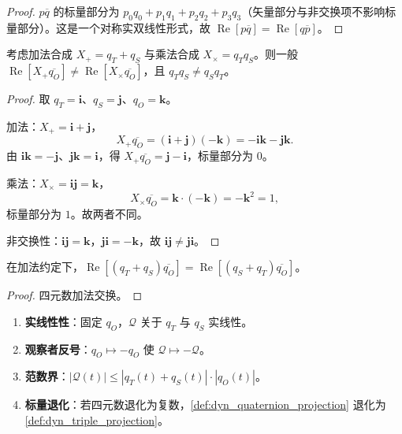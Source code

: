 \begin{proof}
$p\overline q$ 的标量部分为 $p_0q_0+p_1q_1+p_2q_2+p_3q_3$（矢量部分与非交换项不影响标量部分）。这是一个对称实双线性形式，故 $\operatorname{Re}[p\overline q]=\operatorname{Re}[q\overline p]$。
\end{proof}

\begin{theorem}[非交换合成与观察顺序]\label{thm:dyn_quaternion_noncommutative}
考虑加法合成 $X_+=q_T+q_S$ 与乘法合成 $X_\times=q_Tq_S$。则一般 $\operatorname{Re}[X_+\overline{q_O}]\neq\operatorname{Re}[X_\times\overline{q_O}]$，且 $q_Tq_S\neq q_Sq_T$。
\end{theorem}

\begin{proof}
取 $q_T=\mathbf i$、$q_S=\mathbf j$、$q_O=\mathbf k$。

加法：$X_+=\mathbf i+\mathbf j$，
\[
X_+\overline{q_O}=(\mathbf i+\mathbf j)(-\mathbf k)=-\mathbf i\mathbf k-\mathbf j\mathbf k.
\]
由 $\mathbf i\mathbf k=-\mathbf j$、$\mathbf j\mathbf k=\mathbf i$，得 $X_+\overline{q_O}=\mathbf j-\mathbf i$，标量部分为 $0$。

乘法：$X_\times=\mathbf i\mathbf j=\mathbf k$，
\[
X_\times\overline{q_O}=\mathbf k\cdot(-\mathbf k)=-\mathbf k^2=1,
\]
标量部分为 $1$。故两者不同。

非交换性：$\mathbf i\mathbf j=\mathbf k$，$\mathbf j\mathbf i=-\mathbf k$，故 $\mathbf i\mathbf j\neq\mathbf j\mathbf i$。
\end{proof}

\begin{corollary}[加法约定的交换性]\label{cor:dyn_quaternion_additive_commutative}
在加法约定下，$\operatorname{Re}[(q_T+q_S)\overline{q_O}]=\operatorname{Re}[(q_S+q_T)\overline{q_O}]$。
\end{corollary}

\begin{proof}
四元数加法交换。
\end{proof}

\begin{property}[四元数动态投影的基本性质]\label{prop:dyn_quaternion_properties}
\begin{enumerate}[label=(\roman*)]
    \item \textbf{实线性性}：固定 $q_O$，$\mathcal Q$ 关于 $q_T$ 与 $q_S$ 实线性。
    \item \textbf{观察者反号}：$q_O\mapsto-q_O$ 使 $\mathcal Q\mapsto-\mathcal Q$。
    \item \textbf{范数界}：$|\mathcal Q(t)|\le|q_T(t)+q_S(t)|\cdot|q_O(t)|$。
    \item \textbf{标量退化}：若四元数退化为复数，\cref{def:dyn_quaternion_projection} 退化为 \cref{def:dyn_triple_projection}。
\end{enumerate}
\end{property}

